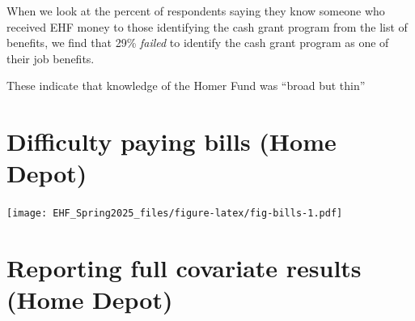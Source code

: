 \documentclass[
  11pt,
  oneside]{article}
\begin{document}
When we look at the percent of respondents saying they know someone who received EHF money to those identifying the cash grant program from the list of benefits, we find that 29\% \emph{failed} to identify the cash grant program as one of their job benefits.

These indicate that knowledge of the Homer Fund was ``broad but thin''

\newpage

\section{Difficulty paying bills (Home Depot)}\label{app-bills}

\texttt{[image: EHF\_Spring2025\_files/figure-latex/fig-bills-1.pdf]}
\newpage

\section{Reporting full covariate results (Home Depot)}\label{app-cov}
\end{document}
